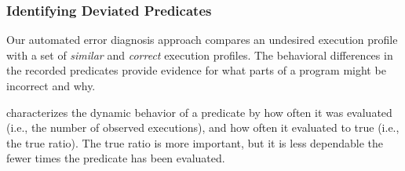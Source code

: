 



\subsubsection{Identifying Deviated Predicates}
\label{sec:deviation}
Our
automated error diagnosis approach compares an undesired execution profile with a set
of \textit{similar} and \textit{correct} execution profiles. 
The behavioral differences in the recorded predicates provide evidence for what parts of a program might be
incorrect and why. %

\ourtool 
characterizes the dynamic behavior of a predicate by 
how often it was
evaluated (i.e., the number of 
observed executions), and how often it evaluated to true (i.e., the true ratio).
The true ratio is more important, but it is less dependable the fewer times
the predicate has been evaluated.


